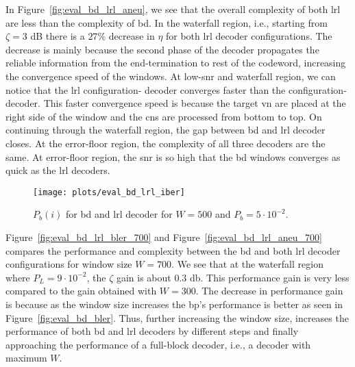 In Figure~\ref{fig:eval_bd_lrl_aneu}, we see that the overall complexity of both \gls{lrl} are less than the complexity of \gls{bd}. In the waterfall region, i.e., starting from $\zeta=3$ dB there is a $27\%$ decrease in $\eta$ for both \gls{lrl} decoder configurations. The decrease is mainly because the second phase of the decoder propagates the reliable information from the end-termination to rest of the codeword, increasing the convergence speed of the windows. At low-\gls{snr} and waterfall region, we can notice that the \gls{lrl} configuration- decoder converges faster than the configuration- decoder. This faster convergence speed is because the target \gls{vn} are placed at the right side of the window and the \glspl{cn} are processed from bottom to top. On continuing through the waterfall region, the gap between \gls{bd} and \gls{lrl} decoder closes. At the error-floor region, the complexity of all three decoders are the same. At error-floor region, the \gls{snr} is so high that the \gls{bd} windows converges as quick as the \gls{lrl} decoders.
\begin{figure}[htbp]
  \centering
  \texttt{[image: plots/eval\_bd\_lrl\_iber]}
  \caption[Individual \acrshort{ber} of \acrshort{bd} and \acrshort{lrl}.]{$P_b(i)$ for \gls{bd} and \gls{lrl} decoder for $W=500$ and $P_b=5\cdot 10^{-2}$.}
  \label{fig:eval_bd_lrl_iber}
\end{figure}

Figure~\ref{fig:eval_bd_lrl_bler_700} and Figure~\ref{fig:eval_bd_lrl_aneu_700} compares the performance and complexity between the \gls{bd} and both \gls{lrl} decoder configurations for window size $W=700$. We see that at the waterfall region where $P_L=9\cdot 10^{-2}$, the $\zeta$ gain is about $0.3$ db. This performance gain is very less compared to the gain obtained with $W=300$. The decrease in performance gain is because as the window size increases the \gls{bp}'s performance is better as seen in Figure~\ref{fig:eval_bd_bler}. Thus, further increasing the window size, increases the performance of both \gls{bd} and \gls{lrl} decoders by different steps and finally approaching the performance of a full-block decoder, i.e., a decoder with maximum $W$.

